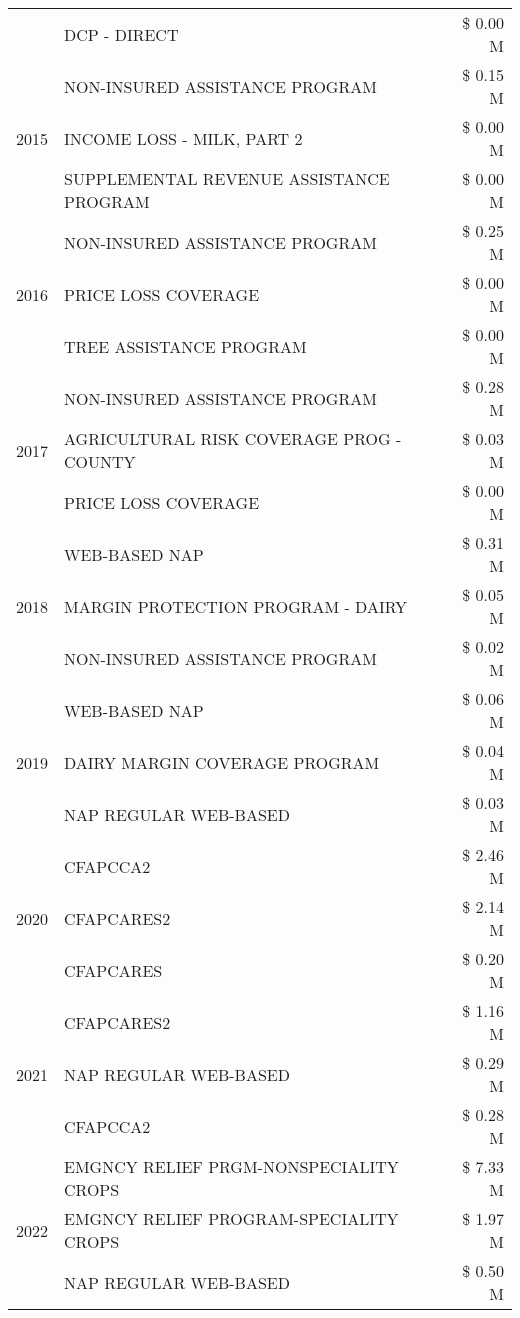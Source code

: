 \begin{tabular}{llr}
 & DCP - DIRECT & \$ 0.00 M \\
\cline{1-3}
\multirow[t]{3}{*}{2015} & NON-INSURED ASSISTANCE PROGRAM & \$ 0.15 M \\
 & INCOME LOSS - MILK, PART 2 & \$ 0.00 M \\
 & SUPPLEMENTAL REVENUE ASSISTANCE PROGRAM & \$ 0.00 M \\
\cline{1-3}
\multirow[t]{3}{*}{2016} & NON-INSURED ASSISTANCE PROGRAM & \$ 0.25 M \\
 & PRICE LOSS COVERAGE & \$ 0.00 M \\
 & TREE ASSISTANCE PROGRAM & \$ 0.00 M \\
\cline{1-3}
\multirow[t]{3}{*}{2017} & NON-INSURED ASSISTANCE PROGRAM & \$ 0.28 M \\
 & AGRICULTURAL RISK COVERAGE PROG - COUNTY & \$ 0.03 M \\
 & PRICE LOSS COVERAGE & \$ 0.00 M \\
\cline{1-3}
\multirow[t]{3}{*}{2018} & WEB-BASED NAP & \$ 0.31 M \\
 & MARGIN PROTECTION PROGRAM - DAIRY & \$ 0.05 M \\
 & NON-INSURED ASSISTANCE PROGRAM & \$ 0.02 M \\
\cline{1-3}
\multirow[t]{3}{*}{2019} & WEB-BASED NAP & \$ 0.06 M \\
 & DAIRY MARGIN COVERAGE PROGRAM & \$ 0.04 M \\
 & NAP REGULAR WEB-BASED & \$ 0.03 M \\
\cline{1-3}
\multirow[t]{3}{*}{2020} & CFAPCCA2 & \$ 2.46 M \\
 & CFAPCARES2 & \$ 2.14 M \\
 & CFAPCARES & \$ 0.20 M \\
\cline{1-3}
\multirow[t]{3}{*}{2021} & CFAPCARES2 & \$ 1.16 M \\
 & NAP REGULAR WEB-BASED & \$ 0.29 M \\
 & CFAPCCA2 & \$ 0.28 M \\
\cline{1-3}
\multirow[t]{3}{*}{2022} & EMGNCY RELIEF PRGM-NONSPECIALITY CROPS & \$ 7.33 M \\
 & EMGNCY RELIEF PROGRAM-SPECIALITY CROPS & \$ 1.97 M \\
 & NAP REGULAR WEB-BASED & \$ 0.50 M \\
\cline{1-3}
\bottomrule
\end{tabular}
